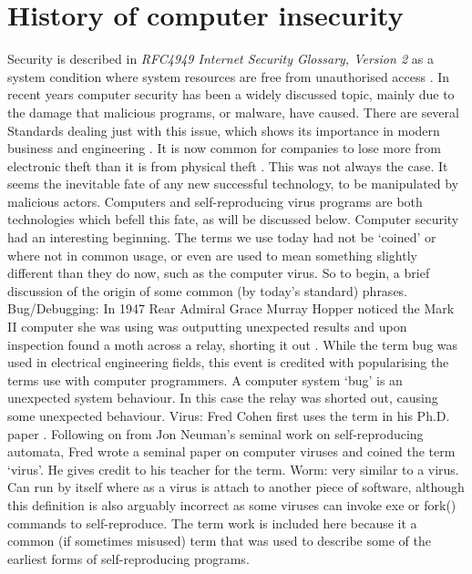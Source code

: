 \section{History of computer insecurity}
Security is described in \textit{RFC4949 Internet Security Glossary, Version 2} as a system condition where system resources are free from unauthorised access \cite{RFC4949}. In recent years computer security has been a widely discussed topic, mainly due to the damage that malicious programs, or malware, have caused. There are several Standards dealing just with this issue, which shows its importance in modern business and engineering \cite{ISO/IEC27005}\cite{ISO/IEC18028.1}\cite{ISO/IEC18028.5}. It is now common for companies to lose more from electronic theft than it is from physical theft \cite{reuters1}. This was not always the case. It seems the inevitable fate of any new successful technology, to be manipulated by malicious actors. Computers and self-reproducing virus programs are both technologies which befell this fate, as will be discussed below.
Computer security had an interesting beginning. The terms we use today had not be ‘coined’ or where not in common usage, or even are used to mean something slightly different than they do now, such as the computer virus. So to begin, a brief discussion of the origin of some common (by today's standard) phrases. 
Bug/Debugging: In 1947 Rear Admiral Grace Murray Hopper noticed the Mark II computer she was using was outputting unexpected results and upon inspection found a moth across a relay, shorting it out \cite{bug}. While the term bug was used in electrical engineering fields, this event is credited with popularising the terms use with computer programmers. A computer system ‘bug’ is an unexpected system behaviour. In this case the relay was shorted out, causing some unexpected behaviour. 
Virus: Fred Cohen first uses the term in his Ph.D. paper . Following on from Jon Neuman’s seminal work on self-reproducing automata, Fred wrote a seminal paper on computer viruses and coined the term ‘virus’. He gives credit to his teacher for the term.
Worm: very similar to a virus. Can run by itself where as a virus is attach to another piece of software, although this definition is also arguably incorrect as some viruses can invoke exe or fork() commands to self-reproduce. The term work is included here because it a common (if sometimes misused) term that was used to describe some of the earliest forms of self-reproducing programs.
